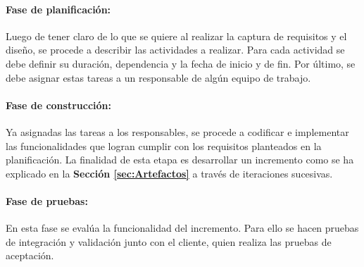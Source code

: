 \paragraph{Fase de planificación: } Luego de tener claro de lo que se quiere al realizar la captura de requisitos y el diseño, se procede a describir las actividades a realizar. Para cada actividad se debe definir su duración, dependencia y la fecha de inicio y de fin. Por último, se debe asignar estas tareas a un responsable de algún equipo de trabajo. 

\paragraph{Fase de construcción: } Ya asignadas las tareas a los responsables, se procede a codificar e implementar las funcionalidades que logran cumplir con los requisitos planteados en la planificación. La finalidad de esta etapa es desarrollar un incremento como se ha explicado en la \textbf{Sección \ref{sec:Artefactos}} a través de iteraciones sucesivas.

\paragraph{Fase de pruebas: } En esta fase se evalúa la funcionalidad del incremento. Para ello se hacen pruebas de integración y validación junto con el cliente, quien realiza las pruebas de aceptación.
